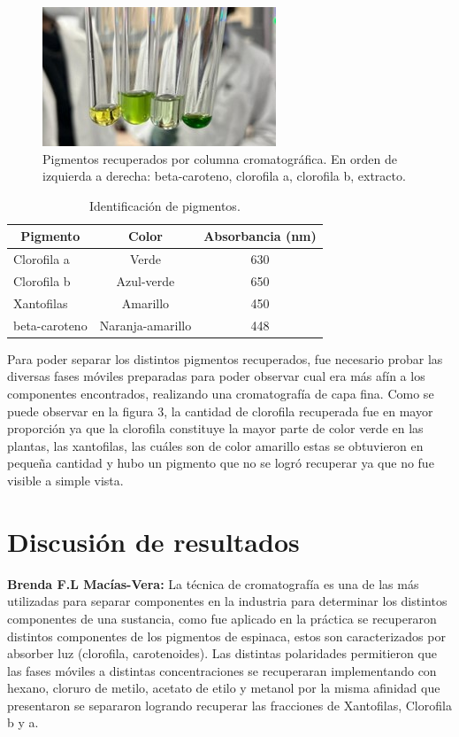 \documentclass{ITESO-Project}
\newcommand{\toprow}[1]{\multicolumn{1}{c}{\textbf{#1}}}
\begin{document}
\begin{figure}[htpb]
    \centering
    \includegraphics[width=0.5\columnwidth]{figuras/pigments.jpg}
    \caption{Pigmentos recuperados por columna cromatográfica. En orden de izquierda a derecha: beta-caroteno, clorofila a, clorofila b, extracto.}
    \label{fig:pigments}
\end{figure}

\begin{table}[htpb]
    \centering
    \caption{Identificación de pigmentos.}
    \begin{tabular}{lcc}
        \toprule
        \toprow{Pigmento} & \toprow{Color} & \toprow{Absorbancia (nm)}\\ \hline
        Clorofila a & Verde & 630\\
        Clorofila b & Azul-verde & 650\\
        Xantofilas & Amarillo & 450\\
        beta-caroteno & Naranja-amarillo & 448 \\
        \bottomrule
    \end{tabular}
    \label{tab:pigment}
\end{table}

Para poder separar los distintos pigmentos recuperados, fue necesario probar las diversas fases móviles preparadas para poder observar cual era más afín a los componentes encontrados, realizando una cromatografía de capa fina. Como se puede observar en la figura 3, la cantidad de clorofila recuperada fue en mayor proporción ya que la clorofila constituye la mayor parte de color verde en las plantas, las xantofilas, las cuáles son de color amarillo estas se obtuvieron en pequeña cantidad y hubo un pigmento que no se logró recuperar ya que no fue visible a simple vista.

\section{Discusión de resultados}

{\color{darkgray}\bfseries Brenda F.L Macías-Vera:}\hspace{1em}
La técnica de cromatografía es una de las más utilizadas para separar componentes en la industria para determinar los distintos componentes de una sustancia, como fue aplicado en la práctica se recuperaron distintos componentes de los pigmentos de espinaca, estos son caracterizados por absorber luz (clorofila, carotenoides). Las distintas polaridades permitieron que las fases móviles a distintas concentraciones se recuperaran implementando con hexano, cloruro de metilo, acetato de etilo y metanol por la misma afinidad que presentaron se separaron logrando recuperar las fracciones de Xantofilas, Clorofila b y a.
\end{document}
